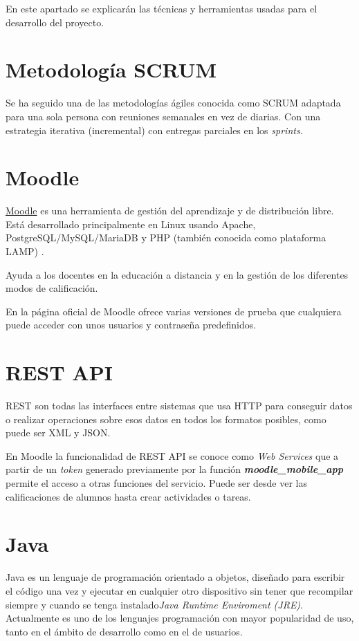 
En este apartado se explicarán las técnicas y herramientas usadas para el desarrollo del proyecto.

\section{Metodología SCRUM}

Se ha seguido una de las metodologías ágiles conocida como SCRUM adaptada para una sola persona con reuniones semanales en vez de diarias. Con una estrategia iterativa (incremental) con entregas parciales en los \textit{sprints}.

\section{Moodle}
\href{https://moodle.org}{Moodle} es una herramienta de gestión del aprendizaje y de distribución libre. Está desarrollado principalmente en Linux usando Apache, PostgreSQL/MySQL/MariaDB y PHP (también conocida como plataforma LAMP) \cite{noauthor_35/instalacion_nodate}.

Ayuda a los docentes en la educación a distancia y en la gestión de los diferentes modos de calificación.




En la página oficial de Moodle ofrece varias versiones de prueba que cualquiera puede acceder con unos usuarios y contraseña predefinidos.

\section{REST API}
REST \cite{noauthor_api_nodate} son todas las interfaces entre sistemas que usa HTTP para conseguir datos o realizar operaciones sobre esos datos en todos los formatos posibles, como puede ser XML y JSON.

En Moodle la funcionalidad de REST API se conoce como \textit{Web Services} que a partir de un \textit{token} generado previamente por la función \textbf{\textit{moodle\_mobile\_app}} permite el acceso a otras funciones del servicio. Puede ser desde ver las calificaciones de alumnos hasta crear actividades o tareas.

\section{Java}
Java es un lenguaje de programación orientado a objetos, diseñado para escribir el código una vez y ejecutar en cualquier otro dispositivo sin tener que recompilar siempre y cuando se tenga instalado\textit{Java Runtime Enviroment (JRE)}. Actualmente es uno de los lenguajes programación con mayor popularidad de uso, tanto en el ámbito de desarrollo como en el de usuarios.

